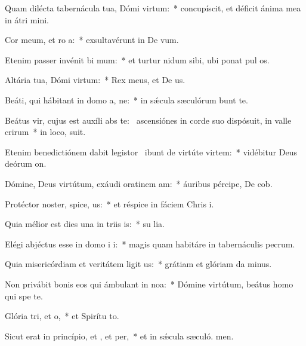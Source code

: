 \item Quam dilécta tabernácula tua, Dómi virtum:~* concupíscit, et déficit ánima mea in átri mini.
\item Cor meum, et ro a:~* exsultavérunt in De vum.
\item Etenim passer invénit bi mum:~* et turtur nidum sibi, ubi ponat pul os.
\item Altária tua, Dómi virtum:~* Rex meus, et De us.
\item Beáti, qui hábitant in domo a, ne:~* in sǽcula sæculórum bunt te.
\item Beátus vir, cujus est auxíli abs te:~\pscross{} ascensiónes in corde suo dispósuit, in valle crirum~* in loco,  suit.
\item Etenim benedictiónem dabit legistor~\pscross{} ibunt de virtúte  virtem:~* vidébitur Deus deórum  on.
\item Dómine, Deus virtútum, exáudi oratinem am:~* áuribus pércipe, De cob.
\item Protéctor noster, spice, us:~* et réspice in fáciem Chris i.
\item Quia mélior est dies una in triis is:~* su lia.
\item Elégi abjéctus esse in domo i i:~* magis quam habitáre in tabernáculis pecrum.
\item Quia misericórdiam et veritátem ligit us:~* grátiam et glóriam da minus.
\item Non privábit bonis eos qui ámbulant in noa:~* Dómine virtútum, beátus homo qui spe  te.
\item Glória tri, et o,~* et Spirítu to.
\item Sicut erat in princípio, et , et per,~* et in sǽcula sæculó. men.
